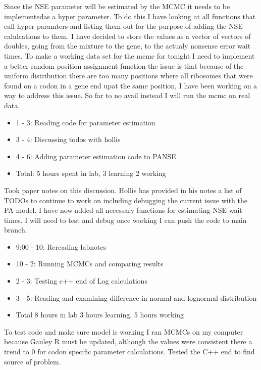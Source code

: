 \documentclass[12pt,hyperref]{labbook}
\begin{document}
Since the NSE parameter will be estimated by the MCMC it needs to be implementedas a hyper parameter. To do this I have looking at all functions that call hyper paramters and listing them out for the purpose of adding the NSE calulcations to them. I have decided to store the values as a vector of vectors of doubles, going from the mixture to the gene, to the actualy nonsense error wait times.
To make a working data set for the mcmc for tonight I need to implement a better random position assignment function the issue is that because of the uniform distribution there are too many positions where all ribosomes that were found on a codon in a gene end upat the same position, I have been working on a way to address this issue. So far to no avail instead I will run the mcmc on real data.
\begin{itemize}
    \item 1 - 3: Reading code for parameter estimation
    \item 3 - 4: Discussing todos with hollis
    \item 4 - 6: Adding parameter estimation code to PANSE
    \item Total: 5 hours spent in lab, 3 learning 2 working
\end{itemize}
Took paper notes on this discussion. Hollis has provided in his notes a list of TODOs to continue to work on including debugging the current issue with the PA model.
I have now added all necessary functions for estimating NSE wait times. I will need to test and debug once working I can push the code to main branch.
\begin{itemize}
    \item 9:00 - 10: Rereading labnotes
    \item 10 - 2: Running MCMCs and comparing results
    \item 2 - 3: Testing c++ end of Log calculations
    \item 3 - 5: Reading and examining difference in normal and lognormal distribution
    \item Total 8 hours in lab 3 hours learning, 5 hours working
\end{itemize}
To test code and make sure model is working I ran MCMCs on my computer because Gauley R must be updated, although the values were consistent there a trend to 0 for codon specific parameter calculations. Tested the C++ end to find source of problem.
\end{document}
